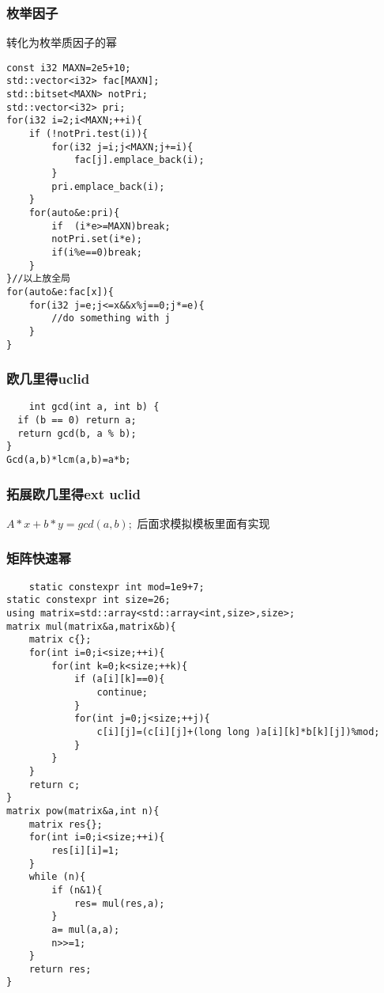 \documentclass[UTF8]{ctexart}
\begin{document}
\subsubsection{枚举因子}
转化为枚举质因子的幂
\begin{lstlisting}
const i32 MAXN=2e5+10;
std::vector<i32> fac[MAXN];
std::bitset<MAXN> notPri;
std::vector<i32> pri;
for(i32 i=2;i<MAXN;++i){
    if (!notPri.test(i)){
        for(i32 j=i;j<MAXN;j+=i){
            fac[j].emplace_back(i);
        }
        pri.emplace_back(i);
    }
    for(auto&e:pri){
        if  (i*e>=MAXN)break;
        notPri.set(i*e);
        if(i%e==0)break;
    }
}//以上放全局
for(auto&e:fac[x]){
    for(i32 j=e;j<=x&&x%j==0;j*=e){
        //do something with j
    }
}
\end{lstlisting}
\subsubsection{欧几里得uclid}
\begin{lstlisting}
    int gcd(int a, int b) {
  if (b == 0) return a;
  return gcd(b, a % b);
}
Gcd(a,b)*lcm(a,b)=a*b;
\end{lstlisting}
\subsubsection{拓展欧几里得ext uclid}
$A*x+b*y=gcd(a,b);$
后面求模拟模板里面有实现
\subsubsection{矩阵快速幂}
\begin{lstlisting}
    static constexpr int mod=1e9+7;
static constexpr int size=26;
using matrix=std::array<std::array<int,size>,size>;
matrix mul(matrix&a,matrix&b){
    matrix c{};
    for(int i=0;i<size;++i){
        for(int k=0;k<size;++k){
            if (a[i][k]==0){
                continue;
            }
            for(int j=0;j<size;++j){
                c[i][j]=(c[i][j]+(long long )a[i][k]*b[k][j])%mod;
            }
        }
    }
    return c;
}
matrix pow(matrix&a,int n){
    matrix res{};
    for(int i=0;i<size;++i){
        res[i][i]=1;
    }
    while (n){
        if (n&1){
            res= mul(res,a);
        }
        a= mul(a,a);
        n>>=1;
    }
    return res;
}
\end{lstlisting}
\end{document}
